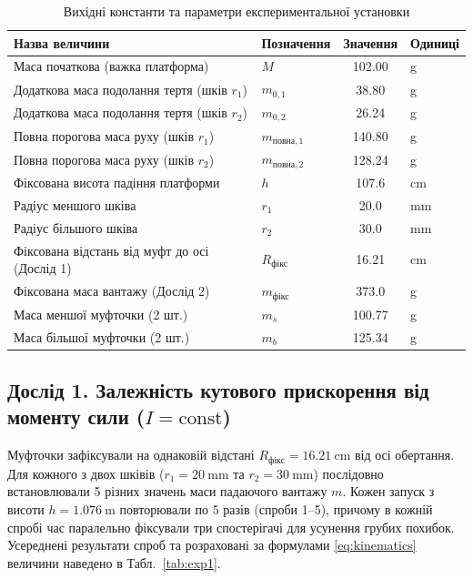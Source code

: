 \documentclass[ukrainian]{ucaphyslab}
\begin{document}
\begin{table}[H]
  \centering
  \begin{tabular}{@{}llcl@{}}
    \toprule
    Назва величини & Позначення & Значення & Одиниці \\
    \midrule
    Маса початкова (важка платформа) & $M$ & \num{102.00} & \si{\gram} \\
    Додаткова маса подолання тертя (шків $r_1$) & $m_{0,1}$ & \num{38.80} & \si{\gram} \\
    Додаткова маса подолання тертя (шків $r_2$) & $m_{0,2}$ & \num{26.24} & \si{\gram} \\
    Повна порогова маса руху (шків $r_1$) & $m_{\text{повна},1}$ & \num{140.80} & \si{\gram} \\
    Повна порогова маса руху (шків $r_2$) & $m_{\text{повна},2}$ & \num{128.24} & \si{\gram} \\
    Фіксована висота падіння платформи & $h$ & \num{107.6} & \si{\centi\meter} \\
    Радіус меншого шківа & $r_1$ & \num{20.0} & \si{\milli\meter} \\
    Радіус більшого шківа & $r_2$ & \num{30.0} & \si{\milli\meter} \\
    Фіксована відстань від муфт до осі (Дослід 1) & $R_{\text{фікс}}$ & \num{16.21} & \si{\centi\meter} \\
    Фіксована маса вантажу (Дослід 2) & $m_{\text{фікс}}$ & \num{373.0} & \si{\gram} \\
    Маса меншої муфточки (2 шт.) & $m_s$ & \num{100.77} & \si{\gram} \\
    Маса більшої муфточки (2 шт.) & $m_b$ & \num{125.34} & \si{\gram} \\
    \bottomrule
  \end{tabular}
  \caption{Вихідні константи та параметри експериментальної установки}
  \label{tab:constants}
\end{table}

\subsection{Дослід 1. Залежність кутового прискорення від моменту сили ($I = \text{const}$)}
Муфточки зафіксували на однаковій відстані $R_{\text{фікс}} = \SI{16.21}{\centi\meter}$ від осі обертання. Для кожного з двох шківів ($r_1 = \SI{20}{\milli\meter}$ та $r_2 = \SI{30}{\milli\meter}$) послідовно встановлювали 5 різних значень маси падаючого вантажу $m$. Кожен запуск з висоти $h = \SI{1.076}{\meter}$ повторювали по 5 разів (спроби 1--5), причому в кожній спробі час паралельно фіксували три спостерігачі для усунення грубих похибок. Усереднені результати спроб та розраховані за формулами \eqref{eq:kinematics} величини наведено в Табл.~\ref{tab:exp1}.
\end{document}
